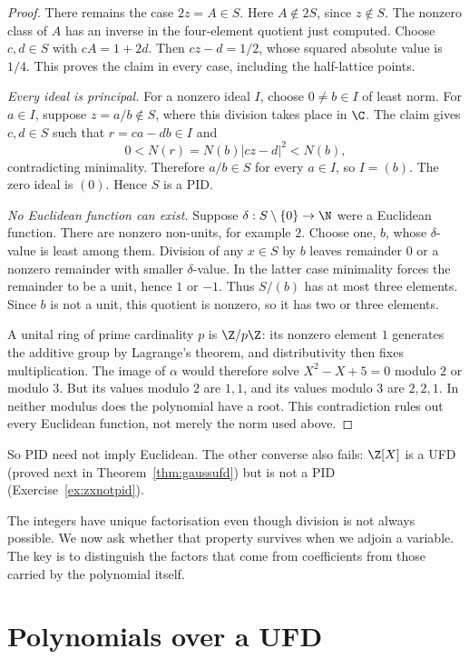 \begin{proof}
There remains the case $2z=A\in S$. Here $A\notin2S$, since
$z\notin S$. The nonzero class of $A$ has an inverse in the
four-element quotient just computed. Choose $c,d\in S$ with
$cA=1+2d$. Then $cz-d=1/2$, whose squared absolute value is $1/4$.
This proves the claim in every case, including the half-lattice points.

\emph{Every ideal is principal.}
For a nonzero ideal $I$, choose $0\ne b\in I$ of least norm.
For $a\in I$, suppose $z=a/b\notin S$, where this division takes
place in $\C$. The claim gives $c,d\in S$ such that
$r=ca-db\in I$ and
\[
0<N(r)=N(b)|cz-d|^2<N(b),
\]
contradicting minimality. Therefore $a/b\in S$ for every $a\in I$,
so $I=(b)$. The zero ideal is $(0)$. Hence $S$ is a PID.

\emph{No Euclidean function can exist.}
Suppose $\delta:S\setminus\{0\}\to\N$ were a Euclidean function.
There are nonzero non-units, for example $2$. Choose one, $b$, whose
$\delta$-value is least among them. Division of any $x\in S$ by $b$
leaves remainder $0$ or a nonzero remainder with smaller $\delta$-value.
In the latter case minimality forces the remainder to be a unit,
hence $1$ or $-1$. Thus $S/(b)$ has at most three elements.
Since $b$ is not a unit, this quotient is nonzero, so it has two or
three elements.

A unital ring of prime cardinality $p$ is $\Z/p\Z$: its nonzero
element $1$ generates the additive group by Lagrange's theorem, and
distributivity then fixes multiplication. The image of $\alpha$
would therefore solve $X^2-X+5=0$ modulo $2$ or modulo $3$.
But its values modulo $2$ are $1,1$, and its values modulo $3$ are
$2,2,1$. In neither modulus does the polynomial have a root. This contradiction rules out
every Euclidean function, not merely the norm used above.
\end{proof}

So PID need not imply Euclidean. The other converse also fails:
$\Z[X]$ is a UFD (proved next in Theorem~\ref{thm:gaussufd}) but is
not a PID (Exercise~\ref{ex:zxnotpid}).

The integers have unique factorisation even though division is not always possible. We now ask whether that property survives when we adjoin a variable. The key is to distinguish the factors that come from coefficients from those carried by the polynomial itself.

\section{Polynomials over a UFD}

